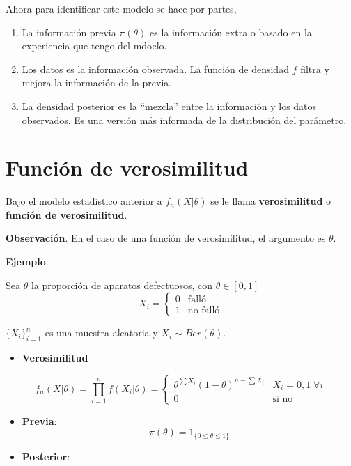 \documentclass[
  12pt,
]{book}
\providecommand{\tightlist}{%
  \setlength{\itemsep}{0pt}\setlength{\parskip}{0pt}}
\begin{document}
Ahora para identificar este modelo se hace por partes,

\begin{enumerate}
\def\labelenumi{\arabic{enumi}.}
\tightlist
\item
  La información previa \(\pi(\theta)\) es la información extra o basado en la
  experiencia que tengo del mdoelo.
\item
  Los datos es la información observada. La función de densidad \(f\) filtra y
  mejora la información de la previa.
\item
  La densidad posterior es la ``mezcla'' entre la información y los datos
  observados. Es una versión más informada de la distribución del parámetro.
\end{enumerate}

\hypertarget{funciuxf3n-de-verosimilitud}{%
\section{Función de verosimilitud}\label{funciuxf3n-de-verosimilitud}}

Bajo el modelo estadístico anterior a \(f_n(X|\theta)\) se le llama \textbf{verosimilitud} o \textbf{función de verosimilitud}.

\textbf{Observación}. En el caso de una función de verosimilitud, el argumento es \(\theta\).

\textbf{Ejemplo}.

Sea \(\theta\) la proporción de aparatos defectuosos, con \(\theta \in [0,1]\)
\[ X_i = \begin{cases}
 0 & \text{falló} \\
 1 & \text{no falló}
 \end{cases}\]

\(\{X_i\}_{i=1}^n\) es una muestra aleatoria y \(X_i \sim Ber(\theta)\).

\begin{itemize}
\tightlist
\item
  \textbf{Verosimilitud}
\end{itemize}

\[ f_n(X|\theta) = \prod_{i=1}^n f(X_i|\theta) = \begin{cases}\theta^{\sum X_i}(1-\theta)^{n-\sum X_i} & X_i = 0,1\; \forall i\\ 0 & \text{si no}\end{cases}\]

\begin{itemize}
\item
  \textbf{Previa}:
  \[\pi(\theta) = 1_{\{0\leq\theta\leq 1\}}\]
\item
  \textbf{Posterior}:
\end{itemize}
\end{document}
